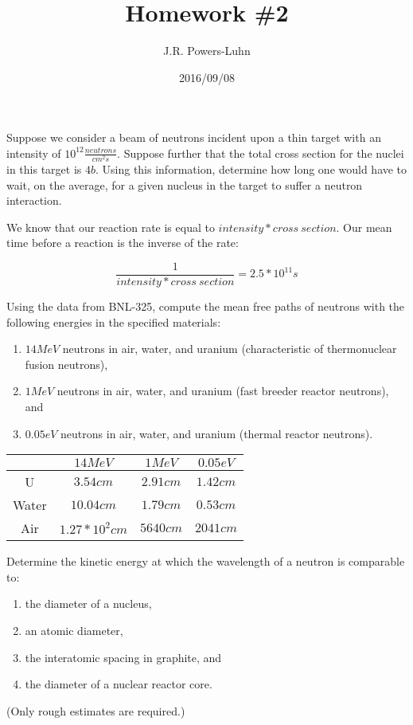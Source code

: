 \documentclass{hw}
\author{J.R. Powers-Luhn}
\date{2016/09/08}
\title{Homework \#2}
\begin{document}
	Suppose we consider a beam of neutrons incident upon a thin target with an intensity of $ 10^{12} \frac{neutrons}{cm^2 s} $. Suppose further that the total cross section for the nuclei in this target is $ 4 b $. Using this information, determine how long one would have to wait, on the average, for a given nucleus in the target to suffer a neutron interaction.

\solution
	We know that our reaction rate is equal to $ intensity * cross\ section $. Our mean time before a reaction is the inverse of the rate:
	
	\[
		\frac{1}{intensity*cross\ section} = 2.5*10^{11}s
	\]

	Using the data from BNL-325, compute the mean free paths of neutrons with the following energies in the specified materials:
	\begin{enumerate}
		\item $ 14 MeV $ neutrons in air, water, and uranium (characteristic of thermonuclear fusion neutrons),
		\item $ 1 MeV $ neutrons in air, water, and uranium (fast breeder reactor neutrons), and
		\item $ 0.05 eV $ neutrons in air, water, and uranium (thermal reactor neutrons).
	\end{enumerate}

\solution
	\begin{table}[h]
		\centering
		\begin{tabular}{ |c|c|c|c| }
			\hline
			& $ 14MeV $ & $ 1MeV $ & $ 0.05eV$ \\
			\hline
			U & $ 3.54cm $ & $ 2.91cm $ & $ 1.42cm $ \\
			Water & $ 10.04cm $ & $ 1.79cm $ & $ 0.53cm $ \\
			Air & $ 1.27*10^2 cm $ & $ 5640 cm $ & $ 2041 cm $ \\
			\hline
		\end{tabular}
	\end{table}

	Determine the kinetic energy at which the wavelength of a neutron is comparable to:
	\begin{enumerate}
		\item the diameter of a nucleus,
		\item an atomic diameter,
		\item the interatomic spacing in graphite, and
		\item the diameter of a nuclear reactor core.
	\end{enumerate}
	(Only rough estimates are required.)
\end{document}
